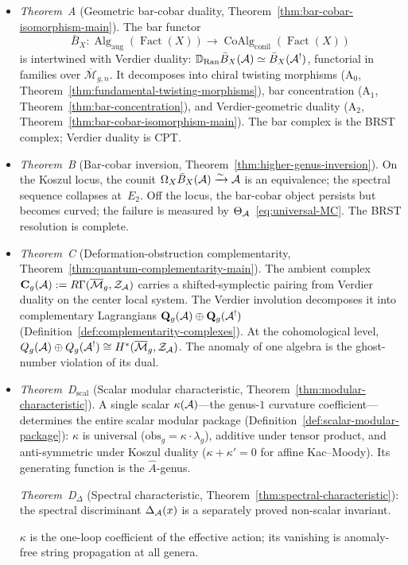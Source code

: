 \begin{itemize}
\item \emph{Theorem~A} (Geometric bar-cobar duality,
  Theorem~\ref{thm:bar-cobar-isomorphism-main}).
  The bar functor
  \[
  \bar{B}_X \colon
  \operatorname{Alg}_{\mathrm{aug}}(\operatorname{Fact}(X))
  \to \operatorname{CoAlg}_{\mathrm{conil}}(\operatorname{Fact}(X))
  \]
  is intertwined with Verdier duality:
  $\mathbb{D}_{\operatorname{Ran}} \bar{B}_X(\mathcal{A})
  \simeq \bar{B}_X(\mathcal{A}^!)$,
  functorial in families over $\overline{\mathcal{M}}_{g,n}$.
  It decomposes into chiral twisting morphisms
  ($\mathrm{A}_0$,
  Theorem~\ref{thm:fundamental-twisting-morphisms}),
  bar concentration
  ($\mathrm{A}_1$, Theorem~\ref{thm:bar-concentration}), and
  Verdier-geometric duality
  ($\mathrm{A}_2$,
  Theorem~\ref{thm:bar-cobar-isomorphism-main}).
  The bar complex is the BRST complex; Verdier duality is CPT.

\item \emph{Theorem~B} (Bar-cobar inversion,
  Theorem~\ref{thm:higher-genus-inversion}).
  On the Koszul locus, the counit
  $\Omega_X \bar{B}_X(\mathcal{A}) \xrightarrow{\sim} \mathcal{A}$
  is an equivalence; the spectral sequence collapses at~$E_2$.
  Off the locus, the bar-cobar object persists but becomes curved;
  the failure is measured by
  $\Theta_{\mathcal{A}}$~\eqref{eq:universal-MC}.
  The BRST resolution is complete.

\item \emph{Theorem~C} (Deformation-obstruction complementarity,
  Theorem~\ref{thm:quantum-complementarity-main}).
  The ambient complex
  $\mathbf{C}_g(\mathcal{A}) := R\Gamma(\overline{\mathcal{M}}_g,
  \mathcal{Z}_{\mathcal{A}})$
  carries a shifted-symplectic pairing from Verdier duality on
  the center local system.  The Verdier involution decomposes it
  into complementary Lagrangians
  $\mathbf{Q}_g(\mathcal{A}) \oplus \mathbf{Q}_g(\mathcal{A}^!)$
  (Definition~\ref{def:complementarity-complexes}).
  At the cohomological level,
  $Q_g(\mathcal{A}) \oplus Q_g(\mathcal{A}^!) \cong
  H^*(\overline{\mathcal{M}}_g, \mathcal{Z}_{\mathcal{A}})$.
  The anomaly of one algebra is the ghost-number violation of
  its dual.

\item \emph{Theorem~D$_{\mathrm{scal}}$} (Scalar modular
  characteristic, Theorem~\ref{thm:modular-characteristic}).
  A single scalar $\kappa(\mathcal{A})$---the genus-$1$ curvature
  coefficient---determines the entire scalar modular package
  (Definition~\ref{def:scalar-modular-package}):
  $\kappa$ is universal
  ($\mathrm{obs}_g = \kappa \cdot \lambda_g$),
  additive under tensor product, and anti-symmetric under
  Koszul duality ($\kappa + \kappa' = 0$ for affine Kac--Moody).
  Its generating function is the $\hat{A}$-genus.

  \emph{Theorem~D$_\Delta$} (Spectral characteristic,
  Theorem~\ref{thm:spectral-characteristic}):
  the spectral discriminant $\Delta_{\mathcal{A}}(x)$ is a separately proved
  non-scalar invariant.

  $\kappa$ is the one-loop coefficient of the effective action;
  its vanishing is anomaly-free string propagation at all genera.
\end{itemize}


